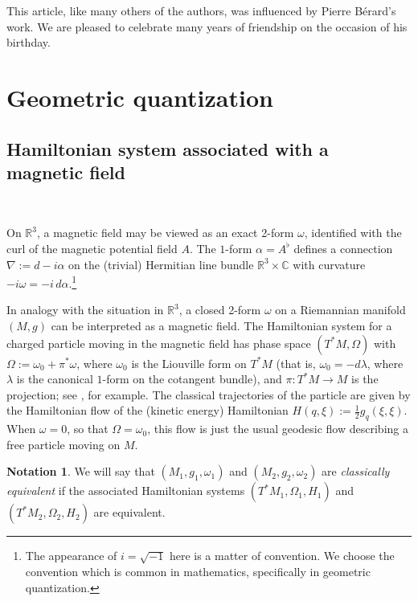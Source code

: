 \documentclass[12pt,leqno]{amsart}%
\theoremstyle{definition}
\newtheorem{nota}[theorem]{Notation}
\theoremstyle{remark}
\numberwithin{equation}{section}
\def\C{{\mathbb{C}}}
\def\R{{\mathbb{R}}}
\def\nab{{\nabla}}
\begin{document}
This
article, like many others of the authors, was influenced by Pierre B\'erard's
work.
We are pleased to celebrate many years of friendship on the occasion of
his birthday.

\section{Geometric quantization}


\subsection{Hamiltonian system associated with a magnetic field}\label{class}\

On $\R^3$, a magnetic field may be viewed as an exact 2-form $\omega$,
identified with the curl of the magnetic potential field $A$.   The $1$-form
$\alpha=A^\flat$ defines a connection $\nab:=d-i\alpha$ on the
(trivial) Hermitian line bundle $\R^3\times \C$ with curvature
$-i\omega=-i\,d\alpha$.\footnote{The appearance of $i=\sqrt{-1}$ here is a
matter
of convention. We choose the convention which is common in mathematics,
specifically in geometric quantization.}

In analogy with the situation in $\R^3$, a closed 2-form $\omega$ on a
Riemannian manifold $(M,g)$ can be interpreted as a magnetic field. The
Hamiltonian system for a charged particle
moving in the magnetic field has phase space $(T^{\ast}M, \Omega)$ with
$\Omega:=\omega_{0}+\pi^{\ast}\omega$, where $\omega_{0}$ is the Liouville form
on $T^*M$ (that is, $\omega_0=-d\lambda$, where $\lambda$ is the canonical
$1$-form on the cotangent bundle), and $\pi:T^{\ast}M\rightarrow M$ is the
projection; see \cite{GSS}, for example.  The
classical trajectories of the particle are given by the Hamiltonian flow of the
(kinetic energy)
Hamiltonian $H(q,\xi):=\frac{1}{2}g_q(\xi,\xi)$.  When $\omega=0$, so that
$\Omega=\omega_0$, this flow is just the usual geodesic flow describing a free
particle moving on $M$.

\begin{nota}\label{ce}  We will say that $(M_1,g_1,\omega_1)$ and
$(M_2,g_2,\omega_2)$ are \emph{classically equivalent} if the associated
Hamiltonian systems $(T^{\ast}M_1, \Omega_1, H_1)$ and $(T^{\ast}M_2,
\Omega_2, H_2)$ are equivalent.
\end{nota}
\end{document}
